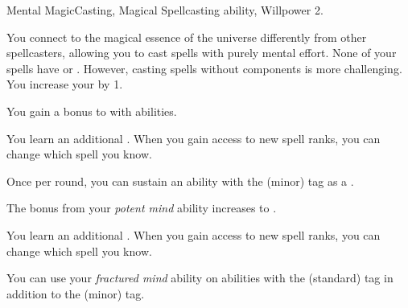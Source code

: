     \begin{feat}{Mental Magic}{Casting, Magical}
        \featpre Spellcasting ability, Willpower 2.

         You connect to the magical essence of the universe differently from other spellcasters, allowing you to cast spells with purely mental effort.
        None of your spells have  or .
        However, casting spells without components is more challenging.
        You increase your  by 1.

         You gain a  bonus to  with  abilities.

         You learn an additional .
        When you gain access to new spell ranks, you can change which spell you know.

         Once per round, you can sustain an ability with the  (minor) tag as a .

         The bonus from your \textit{potent mind} ability increases to .

         You learn an additional .
        When you gain access to new spell ranks, you can change which spell you know.

         You can use your \textit{fractured mind} ability on abilities with the  (standard) tag in addition to the  (minor) tag.
    \end{feat}

